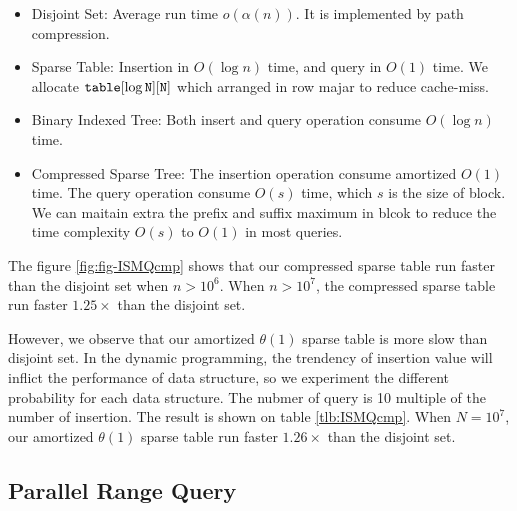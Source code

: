 \begin{itemize}
  \item 

Disjoint Set: Average run time $o(\alpha(n))$.  It is implemented by
path compression.

  \item 

Sparse Table: Insertion in $O(\log n)$ time, and query in $O(1)$ time.
We allocate $\tt{table}[\log N][N]$ which arranged in row majar to
reduce cache-miss.

  \item 

Binary Indexed Tree: Both insert and query operation consume $O(\log
n)$ time.

  \item 

Compressed Sparse Tree: The insertion operation consume amortized
$O(1)$ time.  The query operation consume $O(s)$ time, which $s$ is
the size of block.  We can maitain extra the prefix and suffix maximum
in blcok to reduce the time complexity $O(s)$ to $O(1)$ in most
queries.

\end{itemize}

The figure \ref{fig:fig-ISMQcmp} shows that our compressed sparse
table run faster than the disjoint set when $n > 10^6$.  When $n >
10^7$, the compressed sparse table run faster $1.25 \times$ than the
disjoint set.  

\begin{figure*}[!thb]
  \centering
  
  \caption{ISMQ runs on E5-2620 with different data structures. We use the random test cases without any limitation, e.g. the length of interval query has a uniform distribution.}
  \label{fig:fig-ISMQcmp}
\end{figure*}

However, we observe that our amortized $\theta(1)$ sparse table is more
slow than  disjoint set.  In the dynamic programming, the trendency of insertion value will inflict the performance of data structure, so we experiment the different probability for each data structure.  The nubmer of query is 10 multiple of the number of insertion.  The result is shown on table \ref{tlb:ISMQcmp}.  When $N=10^7$, our amortized $\theta(1)$ sparse table run faster $1.26 \times$ than the disjoint set.



\subsection{Parallel Range Query}

